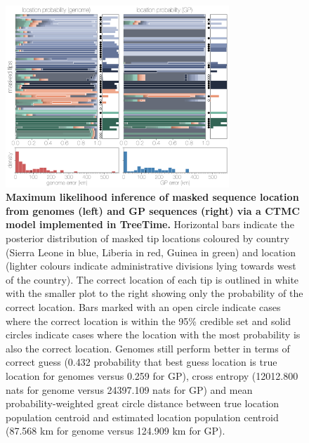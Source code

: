 \documentclass[11pt,oneside,letterpaper]{article}
\begin{document}
\begin{figure}[h]
 \centering
	\includegraphics[width=0.75\textwidth]{supp_figures/sfig5_treetimeLocations.png}
	\caption{\textbf{Maximum likelihood inference of masked sequence location from genomes (left) and GP sequences (right) via a CTMC model implemented in TreeTime.}
  Horizontal bars indicate the posterior distribution of masked tip locations coloured by country (Sierra Leone in blue, Liberia in red, Guinea in green) and location (lighter colours indicate administrative divisions lying towards west of the country).
  The correct location of each tip is outlined in white with the smaller plot to the right showing only the probability of the correct location.
  Bars marked with an open circle indicate cases where the correct location is within the 95\% credible set and solid circles indicate cases where the location with the most probability is also the correct location.
  Genomes still perform better in terms of correct guess (0.432 probability that best guess location is true location for genomes versus 0.259 for GP), cross entropy (12012.800 nats for genome versus 24397.109 nats for GP) and mean probability-weighted great circle distance between true location population centroid and estimated location population centroid (87.568 km for genome versus 124.909 km for GP).
	}
	\label{TTlocations}
\end{figure}
\end{document}
